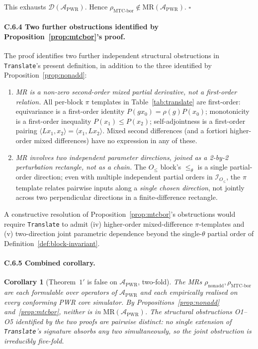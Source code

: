 \documentclass[acmsmall, screen]{acmart}
\newtheorem*{corollary*}{Corollary}
\begin{document}
This exhausts $\mathcal{D}(\mathcal{A}_{\mathrm{PWR}})$. Hence $\rho_{\mathrm{MTC\text{-}bor}} \notin \mathrm{MR}(\mathcal{A}_{\mathrm{PWR}})$. \hfill$\square$

\paragraph{C.6.4 Two further obstructions identified by Proposition~\ref{prop:mtcbor}'s proof.}
The proof identifies two further independent structural obstructions in \texttt{Translate}'s present definition, in addition to the three identified by Proposition~\ref{prop:nonadd}:
\begin{enumerate}[leftmargin=*,nosep]
  \item[(O4)] \emph{MR is a non-zero second-order mixed partial derivative, not a first-order relation.} All per-block $\pi$ templates in Table~\ref{tab:translate} are first-order: equivariance is a first-order identity $P(g x_{0}) = \rho(g) P(x_{0})$; monotonicity is a first-order inequality $P(x_{1}) \le P(x_{2})$; self-adjointness is a first-order pairing $\langle L x_{1}, x_{2}\rangle = \langle x_{1}, L x_{2}\rangle$. Mixed second differences (and a fortiori higher-order mixed differences) have no expression in any of these.
  \item[(O5)] \emph{MR involves two independent parameter directions, joined as a 2-by-2 perturbation rectangle, not as a chain.} The $O_{\le}$ block's $\le_{\theta}$ is a single partial-order direction; even with multiple independent partial orders in $\mathcal{I}_{O_{\le}}$, the $\pi$ template relates pairwise inputs along a \emph{single chosen direction}, not jointly across two perpendicular directions in a finite-difference rectangle.
\end{enumerate}

A constructive resolution of Proposition~\ref{prop:mtcbor}'s obstructions would require \texttt{Translate} to admit (iv) higher-order mixed-difference $\pi$-templates and (v) two-direction joint parametric dependence beyond the single-$\theta$ partial order of Definition~\ref{def:block-invariant}.

\paragraph{C.6.5 Combined corollary.}
\begin{corollary*}[Theorem~$1'$ is false on $\mathcal{A}_{\mathrm{PWR}}$, two-fold]
The MRs $\rho_{\mathrm{nonadd}}, \rho_{\mathrm{MTC\text{-}bor}}$ are each formulable over operators of $\mathcal{A}_{\mathrm{PWR}}$ and each empirically realised on every conforming PWR core simulator. By Propositions~\ref{prop:nonadd} and~\ref{prop:mtcbor}, neither is in $\mathrm{MR}(\mathcal{A}_{\mathrm{PWR}})$. The structural obstructions O1--O5 identified by the two proofs are pairwise distinct: no single extension of \texttt{Translate}'s signature absorbs any two simultaneously, so the joint obstruction is irreducibly five-fold.
\end{corollary*}
\end{document}
